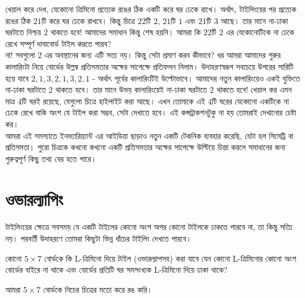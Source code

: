 \documentclass[11pt]{report}
\begin{document}
খেয়াল করে দেখ, যেকোনো ত্রিমিনো প্রত্যেক রঙের ঠিক একটি করে ঘর ঢেকে রাখে। অর্থাৎ, টাইলিংয়ের পর প্রত্যেক রঙের ঠিক $21$টি করে ঘর ঢেকে রাখবে। কিন্তু চিত্রে $22$টি $2$, $21$টি $1$ এবং $21$টি $3$ আছে। তার মানে না-ঢাকা ঘরটাতে নিশ্চয় $2$ থাকতে হবে! আমাদের সমাধান কিন্তু শেষ হয়নি। আমরা কি $22$টি $2$ এর যেকোনোটিকে না ঢেকে রেখে সম্পূর্ণ দাবাবোর্ড টাইল করতে পারব?\\

না! সবগুলো $2$ এর অবস্থানের জন্য এটি সত্য নয়। কিন্তু সেটা প্রমাণ করব কীভাবে? ধর আমরা আমাদের শুরুর কালারিংটা নিয়ে বোর্ডের উল্লম্ব প্রতিসমতার অক্ষের সাপেক্ষে প্রতিফলন নিলাম। উদাহরণস্বরূপ সবচেয়ে উপরের সারিটি হয়ে যাবে $2, 1, 3, 2, 1, 3, 2, 1$ - অর্থাৎ পূর্বের কালারিংটিই উল্টোভাবে। আমাদের নতুন কালারিংয়েও একই যুক্তিতে না-ঢাকা ঘরটাতে $2$ থাকতে হবে। তার মানে উভয় কালারিংয়েই না-ঢাকা ঘরটাতে $2$ থাকতে হবে! খেয়াল কর এমন মাত্র $4$টি ঘরই রয়েছে, যেগুলো চিত্রে হাইলাইট করা আছে। এখন তোমাকে এই $4$টি ঘরের যেকোনো একটিকে না ঢেকে রেখে বাকি অংশ যে টাইল করা সম্ভব, সেটা দেখাতে হবে। এই কন্সট্রাকশনটুকু না হয় তোমরাই দেখানোর চেষ্টা কর।\\

আমরা এই সমস্যাতে ইনভ্যারিয়্যান্ট এর আইডিয়া ছাড়াও নতুন একটি টেকনিক ব্যবহার করেছি, যেটা হল সিমেট্রি বা প্রতিসমতা। পুরো চিত্রকে কখনো কখনো একটি প্রতিসমতার অক্ষের সাপেক্ষে উল্টিয়ে চিন্তা করলে সমাধানের জন্য গুরুত্বপূর্ণ কিছু তথ্য বের হতে পারে।

\section{ওভারল্যাপিং}

টাইলিংয়ের ক্ষেত্রে সবসময় যে একটি টাইলের কোনো অংশ অপর কোনো টাইলকে ঢাকতে পারবে না, তা কিন্তু সত্যি নয়। পরবর্তী উদাহরণে তোমরা কিছুটা ভিন্ন ধাঁচের টাইলিং দেখতে পারবে।\\

\begin{tcolorbox}[colframe=black!80!green,title=Russia 1996]
কোনো $5 \times 7$ বোর্ডকে কি L-ত্রিমিনো দিয়ে টাইল (ওভারল্যাপসহ) করা যাবে যেন কোনো L-ত্রিমিনোর কোনো অংশ বোর্ডের বাইরে না থাকে এবং বোর্ডের প্রতিটি ঘর সমসংখ্যক L-ত্রিমিনো দিয়ে ঢাকা থাকে?
\end{tcolorbox}

আমরা $5 \times 7$ বোর্ডকে নিচের চিত্রের মতো করে রঙ করি।
\end{document}
